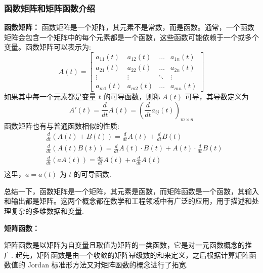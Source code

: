         \subsubsection{函数矩阵和矩阵函数介绍}
            \par \textbf{函数矩阵：} 函数矩阵是一个矩阵，其元素不是常数，而是函数。通常，一个函数矩阵会包含一个矩阵中的每个元素都是一个函数，这些函数可能依赖于一个或多个变量。函数矩阵可以表示为:
            \begin{equation*}
                A(t) = \begin{bmatrix}
                    a_{11}(t) & a_{12}(t) & \ldots & a_{1n}(t) \\
                    a_{21}(t) & a_{22}(t) & \ldots & a_{2n}(t) \\
                    \vdots & \vdots & \ddots & \vdots \\
                    a_{m1}(t) & a_{m2}(t) & \ldots & a_{mn}(t)
                \end{bmatrix}
            \end{equation*}
            如果其中每一个元素都是变量 $t$ 的可导函数，则称 $A(t)$ 可导，其导数定义为
            \begin{equation*}
                A'(t) = \frac{d}{dt}A(t) = (\frac{d}{dt}a_{ij}(t))_{m \times n}
            \end{equation*}
            函数矩阵也有与普通函数相似的性质:
            \begin{align*}
                &\frac{d}{dt}(A(t) + B(t)) = \frac{d}{dt}A(t) + \frac{d}{dt}B(t) \\
                &\frac{d}{dt}(A(t)B(t)) = \frac{d}{dt}A(t) \cdot B(t) + A(t) \cdot \frac{d}{dt}B(t) \\ 
                &\frac{d}{dt}(aA(t)) = \frac{da}{dt}A(t) + a\frac{d}{dt}A(t) \\
            \end{align*}
            这里，$a = a(t)$ 为 $t$ 的可导函数.
            \par 总结一下，函数矩阵是一个矩阵，其元素是函数，而矩阵函数是一个函数，其输入和输出都是矩阵。这两个概念都在数学和工程领域中有广泛的应用，用于描述和处理复杂的多维数据和变量.
            \\
            \par \textbf{矩阵函数：} \par 矩阵函数是以矩阵为自变量且取值为矩阵的一类函数，它是对一元函数概念的推广. 起先，矩阵函数是由一个收敛的矩阵幂级数的和来定义，之后根据计算矩阵函数值的 Jordan 标准形方法又对矩阵函数的概念进行了拓宽.
